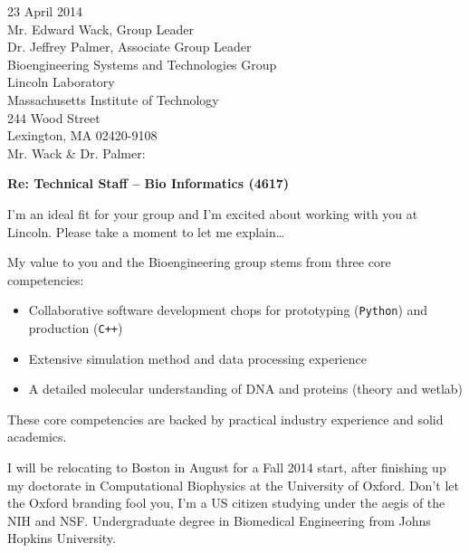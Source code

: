 \documentclass{../res}
\begin{document}
 
\begin{sloppypar}
 
%


\begin{resume} 
 
\vspace{1\baselineskip}
23 April 2014 \\

Mr. Edward Wack, Group Leader \\
Dr. Jeffrey Palmer, Associate Group Leader \\
Bioengineering Systems and Technologies Group \\
Lincoln Laboratory \\
Massachusetts Institute of Technology \\
244 Wood Street \\
Lexington, MA 02420-9108 \\

Mr. Wack \& Dr. Palmer:

\textbf{Re: Technical Staff -- Bio Informatics (4617)}

I'm an ideal fit for your group and I'm excited about working with you at Lincoln. Please take a moment to let me explain\ldots

My value to you and the Bioengineering group stems from three core competencies: 
\begin{itemize}[itemindent=1cm]
    \item Collaborative software development chops for prototyping (\texttt{Python}) and production (\texttt{C++})
    \item Extensive simulation method and data processing experience
    \item A detailed molecular understanding of DNA and proteins (theory and wetlab)
\end{itemize}
These core competencies are backed by practical industry experience and solid academics.

I will be relocating to Boston in August for a Fall 2014 start, after finishing up my doctorate in Computational Biophysics at the University of Oxford. Don't let the Oxford branding fool you, I'm a US citizen studying under the aegis of the NIH and NSF. Undergraduate degree in Biomedical Engineering from Johns Hopkins University.


\end{resume}
\end{sloppypar}
\end{document}
